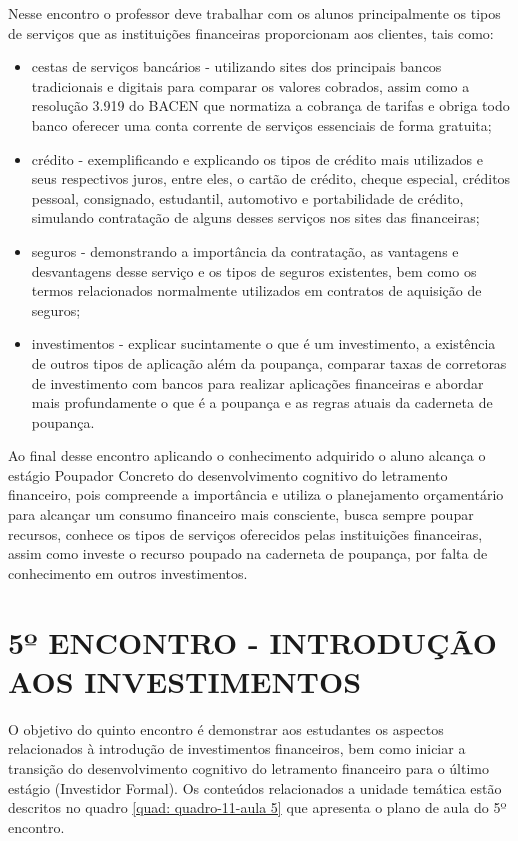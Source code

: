 Nesse encontro o professor deve trabalhar com os alunos principalmente os tipos de serviços que as instituições financeiras proporcionam aos clientes, tais como:

\begin{itemize}
    \item cestas de serviços bancários - utilizando sites dos principais bancos tradicionais e digitais para comparar os valores cobrados, assim como a resolução 3.919 do BACEN que normatiza a cobrança de tarifas e obriga todo banco oferecer uma conta corrente de serviços essenciais de forma gratuita;

    \item crédito - exemplificando e explicando os tipos de crédito mais utilizados e seus respectivos juros, entre eles, o cartão de crédito, cheque especial, créditos pessoal, consignado, estudantil, automotivo e portabilidade de crédito, simulando contratação de alguns desses serviços nos sites das financeiras;

    \item seguros - demonstrando a importância da contratação, as vantagens e desvantagens desse serviço e os tipos de seguros existentes, bem como os termos relacionados normalmente utilizados em contratos de aquisição de seguros;

    \item investimentos - explicar sucintamente o que é um investimento, a existência de outros tipos de aplicação além da poupança, comparar taxas de corretoras de investimento com bancos para realizar aplicações financeiras e abordar mais profundamente o que é a poupança e as regras atuais da caderneta de poupança.
\end{itemize}

Ao final desse encontro aplicando o conhecimento adquirido o aluno alcança o estágio Poupador Concreto do desenvolvimento cognitivo do letramento financeiro, pois compreende a importância e utiliza o planejamento orçamentário para alcançar um consumo financeiro mais consciente, busca sempre poupar recursos, conhece os tipos de serviços oferecidos pelas instituições financeiras, assim como investe o recurso poupado na caderneta de poupança, por falta de conhecimento em outros investimentos.

\section{5º ENCONTRO - INTRODUÇÃO AOS INVESTIMENTOS}
O objetivo do quinto encontro é demonstrar aos estudantes os aspectos relacionados à introdução de investimentos financeiros, bem como iniciar a transição do desenvolvimento cognitivo do letramento financeiro para o último estágio (Investidor Formal). Os conteúdos relacionados a unidade temática estão descritos no quadro \ref{quad: quadro-11-aula 5} que apresenta o plano de aula do 5º encontro.

